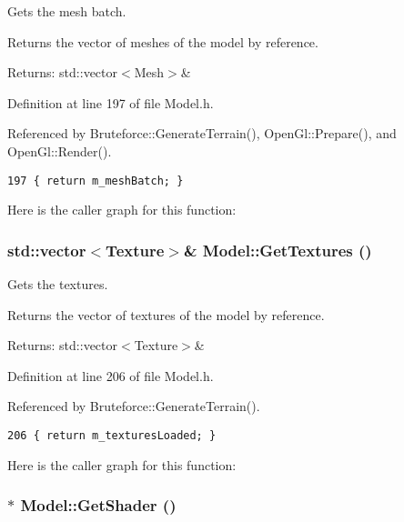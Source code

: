 Gets the mesh batch. 

Returns the vector of meshes of the model by reference.

\begin{Desc}
\item[Returns:]std::vector$<$Mesh$>$\& \end{Desc}


Definition at line 197 of file Model.h.

Referenced by Bruteforce::GenerateTerrain(), OpenGl::Prepare(), and OpenGl::Render().

\begin{Code}\begin{verbatim}197 { return m_meshBatch; }
\end{verbatim}
\end{Code}




Here is the caller graph for this function:\hypertarget{class_model_3ba990a64ec154e543ffe4a529220cc4}{
\subsubsection[GetTextures]{\setlength{\rightskip}{0pt plus 5cm}std::vector$<$Texture$>$\& Model::GetTextures ()}}
\label{class_model_3ba990a64ec154e543ffe4a529220cc4}


Gets the textures. 

Returns the vector of textures of the model by reference.

\begin{Desc}
\item[Returns:]std::vector$<$Texture$>$\& \end{Desc}


Definition at line 206 of file Model.h.

Referenced by Bruteforce::GenerateTerrain().

\begin{Code}\begin{verbatim}206 { return m_texturesLoaded; }
\end{verbatim}
\end{Code}




Here is the caller graph for this function:\hypertarget{class_model_985c54c42525ea8e9885977eff7027de}{
\subsubsection[GetShader]{$\ast$ Model::GetShader ()}}
\label{class_model_985c54c42525ea8e9885977eff7027de}


